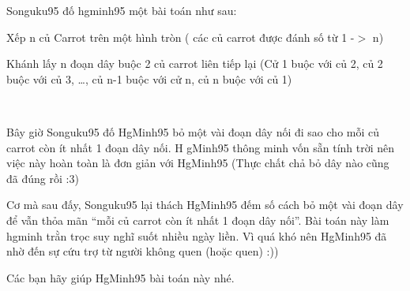 Songuku95 đố hgminh95 một bài toán như sau:

Xếp n củ Carrot trên một hình tròn ( các củ carrot được đánh số từ 1 -$>$ n)

Khánh lấy n đoạn dây buộc 2 củ carrot liên tiếp lại (Cử 1 buộc với củ 2, củ 2 buộc với củ 3, …, củ n-1 buộc với cử n, củ n buộc với củ 1)

 

Bây giờ Songuku95 đố HgMinh95 bỏ một vài đoạn dây nối đi sao cho mỗi củ carrot còn ít nhất 1 đoạn dây nối. H gMinh95 thông minh vốn sẵn tính trời nên việc này hoàn toàn là đơn giản với HgMinh95 (Thực chất chả bỏ dây nào cũng đã đúng rồi :3)

Cơ mà sau đấy, Songuku95 lại thách HgMinh95 đếm số cách bỏ một vài đoạn dây để vẫn thỏa mãn “mỗi củ carrot còn ít nhất 1 đoạn dây nối”. Bài toán này làm hgminh trằn trọc suy nghĩ suốt nhiều ngày liền. Vì quá khó nên HgMinh95 đã nhờ đến sự cứu trợ từ người không quen (hoặc quen) :))

Các bạn hãy giúp HgMinh95 bài toán này nhé.
